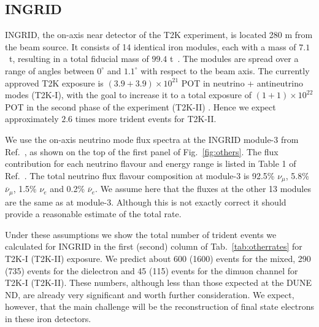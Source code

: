 \subsection{INGRID}
\label{subsec:INGRID}
INGRID, the on-axis near detector of the T2K experiment, is located 280 m from the beam source. It consists of 14 identical iron modules, each with a mass of $7.1$~t, resulting in a total fiducial mass of $99.4$ t~\cite{Abe:2011xv}. The modules are spread over a range of angles between $0^\circ$ and $1.1^\circ$ with respect to the beam axis. The currently approved T2K exposure is $(3.9+3.9)\times 10^{21}$ 
POT in neutrino + antineutrino modes (T2K-I), with the goal to increase it to a total exposure of $(1+1)\times 10^{22}$ POT in the second phase of the experiment (T2K-II) \cite{Abe:2016tez}. Hence we expect approximately $2.6$ times more trident events for T2K-II. 

We use the on-axis neutrino mode flux spectra at the INGRID module-3 from Ref.~\cite{Abe:2015biq}, as shown on the top of the first panel of Fig.~\ref{fig:others}. The flux contribution for each neutrino flavour and  energy range is listed in Table 1 of Ref.~\cite{Abe:2015biq}. The total neutrino flux flavour composition at module-3 is 92.5\% $\nu_\mu$, 5.8\% $\overline\nu_\mu$,  1.5\% $\nu_e$ and 0.2\%  $\overline\nu_e$. We assume here that the fluxes at the other 13 modules are the same as at module-3. Although this is not exactly correct it should provide a reasonable estimate of the total rate.

Under these assumptions we show the total number of trident events we calculated for INGRID in 
the first (second) column of Tab.~\ref{tab:otherrates} for T2K-I (T2K-II) exposure.
We predict about 600 (1600) events for the mixed, 290 (735) events for the dielectron and 45 (115) 
events for the dimuon channel for T2K-I (T2K-II). These numbers, although less than 
those expected at the DUNE ND, are already very significant and worth further consideration. We expect, however, that the main challenge will be the reconstruction of final state electrons in these iron detectors.

